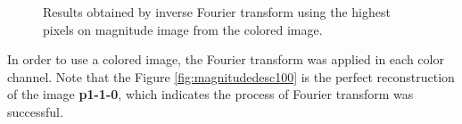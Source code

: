 \documentclass[12pt,a4paper]{article}
\begin{document}
\begin{figure}[!h]
{{		}
		\label{fig:magnitudedesc50}
	}
	\quad
	\quad

	\caption{Results obtained by inverse Fourier transform using the highest pixels on magnitude image from the colored image.}
	\label{fig:magnitudeDESCColored}
\end{figure}

In order to use a colored image, the Fourier transform was applied in each color channel. Note that the Figure \ref{fig:magnitudedesc100} is the perfect reconstruction of the image \textbf{p1-1-0}, which indicates the process of Fourier transform was successful.

\newpage
\end{document}
